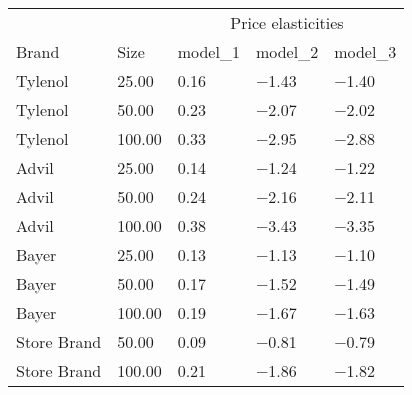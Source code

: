 \begin{table}
\centering
\begin{tabular}[t]{lllll}
\toprule
\multicolumn{2}{c}{ } & \multicolumn{3}{c}{Price elasticities} \\
\cmidrule(l{3pt}r{3pt}){3-5}
Brand & Size & model_1 & model_2 & model_3\\
\midrule
Tylenol & \num{25.00} & \num{0.16} & \num{-1.43} & \num{-1.40}\\
Tylenol & \num{50.00} & \num{0.23} & \num{-2.07} & \num{-2.02}\\
Tylenol & \num{100.00} & \num{0.33} & \num{-2.95} & \num{-2.88}\\
Advil & \num{25.00} & \num{0.14} & \num{-1.24} & \num{-1.22}\\
Advil & \num{50.00} & \num{0.24} & \num{-2.16} & \num{-2.11}\\
Advil & \num{100.00} & \num{0.38} & \num{-3.43} & \num{-3.35}\\
Bayer & \num{25.00} & \num{0.13} & \num{-1.13} & \num{-1.10}\\
Bayer & \num{50.00} & \num{0.17} & \num{-1.52} & \num{-1.49}\\
Bayer & \num{100.00} & \num{0.19} & \num{-1.67} & \num{-1.63}\\
Store Brand & \num{50.00} & \num{0.09} & \num{-0.81} & \num{-0.79}\\
Store Brand & \num{100.00} & \num{0.21} & \num{-1.86} & \num{-1.82}\\
\bottomrule
\end{tabular}
\end{table}
